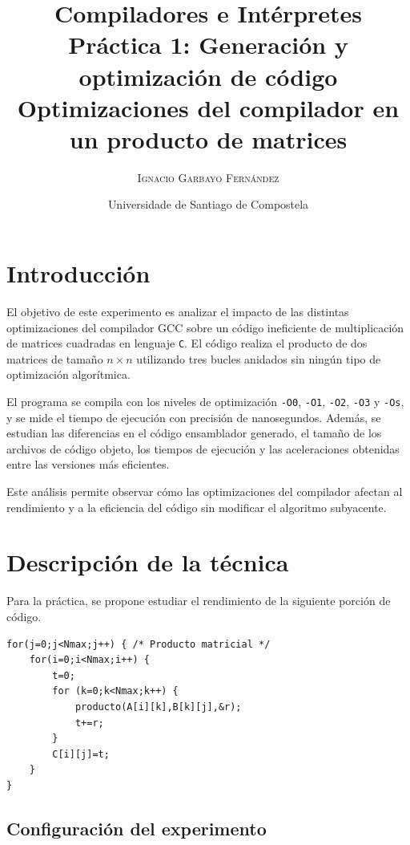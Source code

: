\documentclass[11pt,a4paper,twoside]{article}
\title{%
	\LARGE \textbf{Compiladores e Intérpretes} \\ \vspace*{1cm} \textbf{Práctica 1: Generación y optimización de código}
	\\ \Large \textbf{Optimizaciones del compilador en un producto de matrices}}
\author{\textsc{Ignacio Garbayo Fernández}}
\date{Universidade de Santiago de Compostela}
\theoremstyle{definition}
\begin{document}
	
	\maketitle
	\thispagestyle{empty}
	
	\vspace*{1cm}
	
	\renewcommand{\contentsname}{Índice} %
	\tableofcontents


	\newpage


	\section{Introducción}
	
	El objetivo de este experimento es analizar el impacto de las distintas optimizaciones del compilador GCC sobre un código ineficiente de multiplicación de matrices cuadradas en lenguaje \texttt{C}. El código realiza el producto de dos matrices de tamaño $n \times n$ utilizando tres bucles anidados sin ningún tipo de optimización algorítmica.
	
	El programa se compila con los niveles de optimización \texttt{-O0}, \texttt{-O1}, \texttt{-O2}, \texttt{-O3} y \texttt{-Os}, y se mide el tiempo de ejecución con precisión de nanosegundos. Además, se estudian las diferencias en el código ensamblador generado, el tamaño de los archivos de código objeto, los tiempos de ejecución y las aceleraciones obtenidas entre las versiones más eficientes.
	
	Este análisis permite observar cómo las optimizaciones del compilador afectan al rendimiento y a la eficiencia del código sin modificar el algoritmo subyacente.
	

	\section{Descripción de la técnica}
	
	Para la práctica, se propone estudiar el rendimiento de la siguiente porción de código.
	
	\begin{verbatim}
for(j=0;j<Nmax;j++) { /* Producto matricial */
	for(i=0;i<Nmax;i++) {
		t=0;
		for (k=0;k<Nmax;k++) {
			producto(A[i][k],B[k][j],&r);
			t+=r; 
		}
		C[i][j]=t; 
	} 
}
	\end{verbatim}
	
	
	\subsection{Configuración del experimento}
	
\end{document}
